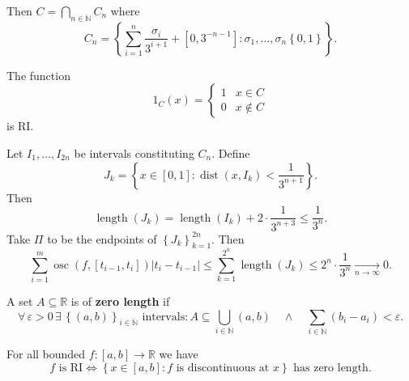 \documentclass{notes}
\begin{document}
  Then $C = \bigcap_{n \in \mathbb N} C_n$ where 
  \[
    C_n = \left \{ \sum_{i = 1}^n \frac{\sigma_i}{3^{i + 1}} + [0, 3^{-n - 1}] : \sigma_1, \dots, \sigma_n \left \{ 0, 1 \right \} \right \}.
  \]
  
  \begin{lem}
    The function 
    \[
      1_C(x) = \begin{cases}
        1 & x \in C \\ 
        0 & x \not \in C
      \end{cases}
    \]
    is RI.
  \end{lem}
  
  \begin{prf}
    Let $I_1, \dots, I_{2 n}$ be intervals constituting $C_n$.
    Define 
    \[
      J_k = \left \{ x \in [0, 1] : \operatorname{dist}(x, I_k) < \frac{1}{3^{n + 1}} \right \}.
    \]
    Then 
    \[
      \operatorname{length}(J_k) = \operatorname{length}(I_k) + 2 \cdot \frac{1}{3^{n + 3}} \leq \frac{1}{3^n}.
    \] 
    Take $\Pi$ to be the endpoints of $\left \{ J_k \right \}_{k = 1}^{2 n}$.
    Then 
    \[
      \sum_{i = 1}^m \operatorname{osc}(f, [t_{i - 1}, t_i]) \left | t_i - t_{i - 1} \right | \leq \sum_{k = 1}^{2^n} \operatorname{length}(J_k) \leq 2^n \cdot \frac{1}{3^n} \underset{n \to \infty}{\longrightarrow} 0.
    \]
  \end{prf}
  
  \begin{defn}
    A set $A \subseteq \mathbb R$ is of {\boldmath \bfseries zero length} if 
    \[
      \forall \, \varepsilon > 0 \, \exists \, \left \{ (a, b) \right \}_{i \in \mathbb N} \text{ intervals}: A \subseteq \bigcup_{i \in \mathbb N} (a, b) \quad \land \quad \sum_{i \in \mathbb N} (b_i - a_i) < \varepsilon.
    \]
  \end{defn}
  
  \begin{thm}[Lebesgue]
    For all bounded $f \colon [a, b] \to \mathbb R$ we have 
    \[
      \text{$f$ is RI} \Leftrightarrow \left \{ x \in [a, b] : \text{$f$ is discontinuous at $x$} \right \} \text{ has zero length}.
    \]
  \end{thm}
\end{document}
